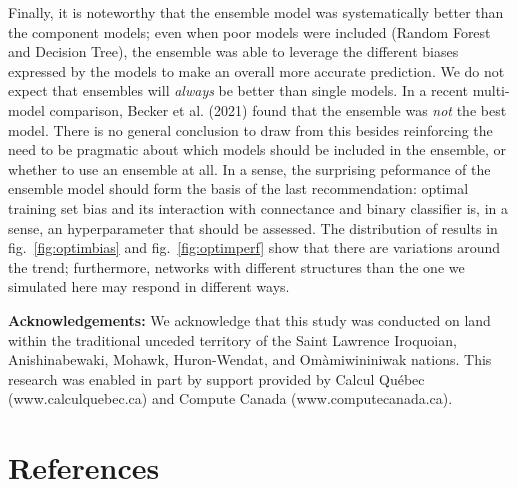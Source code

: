 \documentclass[10pt,oneside]{article}
\begin{document}
Finally, it is noteworthy that the ensemble model was systematically
better than the component models; even when poor models were included
(Random Forest and Decision Tree), the ensemble was able to leverage the
different biases expressed by the models to make an overall more
accurate prediction. We do not expect that ensembles will \emph{always}
be better than single models. In a recent multi-model comparison, Becker
et al. (2021) found that the ensemble was \emph{not} the best model.
There is no general conclusion to draw from this besides reinforcing the
need to be pragmatic about which models should be included in the
ensemble, or whether to use an ensemble at all. In a sense, the
surprising peformance of the ensemble model should form the basis of the
last recommendation: optimal training set bias and its interaction with
connectance and binary classifier is, in a sense, an hyperparameter that
should be assessed. The distribution of results in
fig.~\ref{fig:optimbias} and fig.~\ref{fig:optimperf} show that there
are variations around the trend; furthermore, networks with different
structures than the one we simulated here may respond in different ways.

\textbf{Acknowledgements:} We acknowledge that this study was conducted
on land within the traditional unceded territory of the Saint Lawrence
Iroquoian, Anishinabewaki, Mohawk, Huron-Wendat, and Omàmiwininiwak
nations. This research was enabled in part by support provided by Calcul
Québec (www.calculquebec.ca) and Compute Canada (www.computecanada.ca).

\hypertarget{references}{%
\section*{References}\label{references}}
\end{document}
